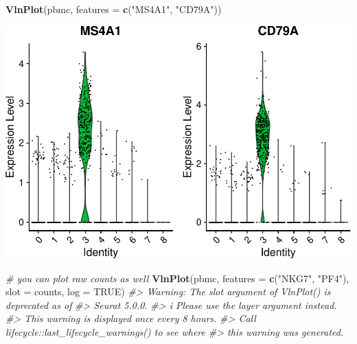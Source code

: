 \documentclass[
]{book}
\newenvironment{Shaded}{\begin{snugshade}}{\end{snugshade}}
\newcommand{\AttributeTok}[1]{\textcolor[rgb]{0.13,0.29,0.53}{#1}}
\newcommand{\CommentTok}[1]{\textcolor[rgb]{0.56,0.35,0.01}{\textit{#1}}}
\newcommand{\ConstantTok}[1]{\textcolor[rgb]{0.56,0.35,0.01}{#1}}
\newcommand{\FunctionTok}[1]{\textcolor[rgb]{0.13,0.29,0.53}{\textbf{#1}}}
\newcommand{\NormalTok}[1]{#1}
\newcommand{\StringTok}[1]{\textcolor[rgb]{0.31,0.60,0.02}{#1}}
\begin{document}
\begin{Shaded}
\begin{Highlighting}[]
\FunctionTok{VlnPlot}\NormalTok{(pbmc, }\AttributeTok{features =} \FunctionTok{c}\NormalTok{(}\StringTok{"MS4A1"}\NormalTok{, }\StringTok{"CD79A"}\NormalTok{))}
\end{Highlighting}
\end{Shaded}

\includegraphics{scRNAseqInR_Doco_files/figure-latex/unnamed-chunk-29-1.pdf}

\begin{Shaded}
\begin{Highlighting}[]
\CommentTok{\# you can plot raw counts as well}
\FunctionTok{VlnPlot}\NormalTok{(pbmc, }\AttributeTok{features =} \FunctionTok{c}\NormalTok{(}\StringTok{"NKG7"}\NormalTok{, }\StringTok{"PF4"}\NormalTok{), }\AttributeTok{slot =} \StringTok{\textquotesingle{}counts\textquotesingle{}}\NormalTok{, }\AttributeTok{log =} \ConstantTok{TRUE}\NormalTok{)}
\CommentTok{\#\textgreater{} Warning: The \textasciigrave{}slot\textasciigrave{} argument of \textasciigrave{}VlnPlot()\textasciigrave{} is deprecated as of}
\CommentTok{\#\textgreater{} Seurat 5.0.0.}
\CommentTok{\#\textgreater{} i Please use the \textasciigrave{}layer\textasciigrave{} argument instead.}
\CommentTok{\#\textgreater{} This warning is displayed once every 8 hours.}
\CommentTok{\#\textgreater{} Call \textasciigrave{}lifecycle::last\_lifecycle\_warnings()\textasciigrave{} to see where}
\CommentTok{\#\textgreater{} this warning was generated.}
\end{Highlighting}
\end{Shaded}
\end{document}
